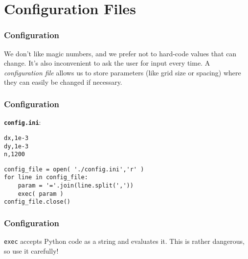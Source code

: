 \documentclass[11pt]{beamer}
\begin{document}
\section{Configuration Files}

\begin{frame}[fragile]
  \frametitle{Configuration}
  \Enlarge

  \begin{enumerate}
  \myitem  We don't like magic numbers, and we prefer not to hard-code values that can change.
  \myitem  It's also inconvenient to ask the user for input every time. \pause
  \myitem  A \emph{configuration file} allows us to store parameters (like grid size or spacing) where they can easily be changed if necessary.
  \end{enumerate}
\end{frame}

\begin{frame}[fragile]
  \frametitle{Configuration}
  \Enlarge

  {\textbf\texttt{config.ini}}:
  \begin{Verbatim}
dx,1e-3
dy,1e-3
n,1200
  \end{Verbatim}
  \bigskip
  \begin{Verbatim}
config_file = open( './config.ini','r' )
for line in config_file:
    param = '='.join(line.split(','))
    exec( param )
config_file.close()
  \end{Verbatim}
\end{frame}

\begin{frame}[fragile]
  \frametitle{Configuration}
  \Enlarge

  \begin{enumerate}
  \myitem  \texttt{exec} accepts Python code as a string and evaluates it. \pause
  \myitem  This is rather dangerous, so use it carefully!
  \end{enumerate}
\end{frame}
\end{document}
